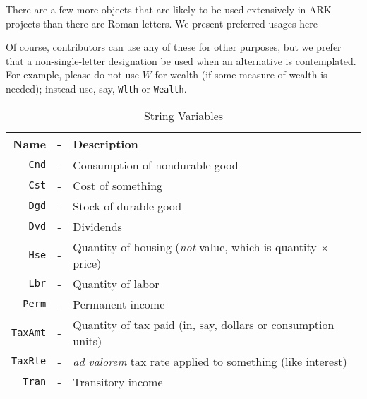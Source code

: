 
There are a few more objects that are likely to be used extensively in ARK projects than there are Roman letters.  We present preferred usages here

Of course, contributors can use any of these for other purposes, but we prefer that a non-single-letter designation be used when an alternative is contemplated.  For example, please do not use $W$ for wealth (if some measure of wealth is needed); instead use, say, \texttt{Wlth} or \texttt{Wealth}.

\begin{table}[h]
\begin{tabular}{||rcl||}
\hline
Name & - & Description
 \\ \hline \texttt{Cnd}    & - & Consumption of nondurable good
 \\  \texttt{Cst}    & - & Cost of something
 \\  \texttt{Dgd}    & - & Stock of durable good
 \\  \texttt{Dvd}    & - & Dividends
 \\  \texttt{Hse}    & - & Quantity of housing ({\it not} value, which is quantity $\times$ price)
 \\  \texttt{Lbr}    & - & Quantity of labor
 \\  \texttt{Perm}   & - & Permanent income
 \\  \texttt{TaxAmt} & - & Quantity of tax paid (in, say, dollars or consumption units)
 \\  \texttt{TaxRte} & - & {\it ad valorem} tax rate applied to something (like interest)
 \\  \texttt{Tran}   & - & Transitory income
\\ \hline
\end{tabular}
\caption{String Variables}
\label{table:Strings}
\end{table}

